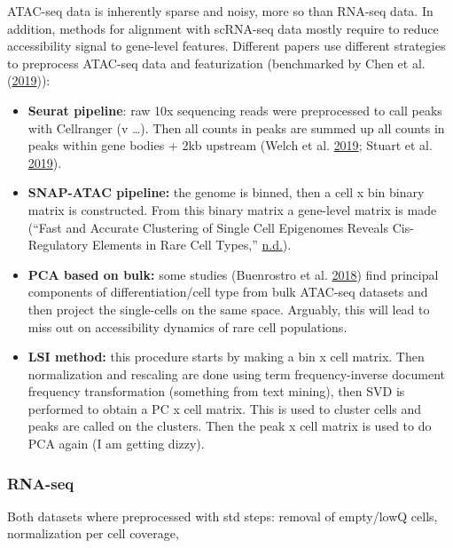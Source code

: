 \documentclass[]{article}
\providecommand{\tightlist}{%
  \setlength{\itemsep}{0pt}\setlength{\parskip}{0pt}}
\begin{document}
ATAC-seq data is inherently sparse and noisy, more so than RNA-seq data.
In addition, methods for alignment with scRNA-seq data mostly require to
reduce accessibility signal to gene-level features. Different papers use
different strategies to preprocess ATAC-seq data and featurization
(benchmarked by Chen et al.
(\protect\hyperlink{ref-chenAssessmentComputationalMethods2019a}{2019})):

\begin{itemize}
\tightlist
\item
  \textbf{Seurat pipeline}: raw 10x sequencing reads were preprocessed
  to call peaks with Cellranger (v \ldots). Then all counts in peaks are
  summed up all counts in peaks within gene bodies + 2kb upstream (Welch
  et al.
  \protect\hyperlink{ref-welchSingleCellMultiomicIntegration2019a}{2019};
  Stuart et al.
  \protect\hyperlink{ref-stuartComprehensiveIntegrationSingleCell2019a}{2019}).
\item
  \textbf{SNAP-ATAC pipeline:} the genome is binned, then a cell x bin
  binary matrix is constructed. From this binary matrix a gene-level
  matrix is made (``Fast and Accurate Clustering of Single Cell
  Epigenomes Reveals Cis-Regulatory Elements in Rare Cell Types,''
  \protect\hyperlink{ref-FastAccurateClusteringa}{n.d.}).
\item
  \textbf{PCA based on bulk:} some studies (Buenrostro et al.
  \protect\hyperlink{ref-buenrostroIntegratedSingleCellAnalysis2018}{2018})
  find principal components of differentiation/cell type from bulk
  ATAC-seq datasets and then project the single-cells on the same space.
  Arguably, this will lead to miss out on accessibility dynamics of rare
  cell populations.
\item
  \textbf{LSI method:} this procedure starts by making a bin x cell
  matrix. Then normalization and rescaling are done using term
  frequency-inverse document frequency transformation (something from
  text mining), then SVD is performed to obtain a PC x cell matrix. This
  is used to cluster cells and peaks are called on the clusters. Then
  the peak x cell matrix is used to do PCA again (I am getting dizzy).
\end{itemize}

\hypertarget{rna-seq}{%
\subsubsection{RNA-seq}\label{rna-seq}}

Both datasets where preprocessed with std steps: removal of empty/lowQ
cells, normalization per cell coverage,
\end{document}
